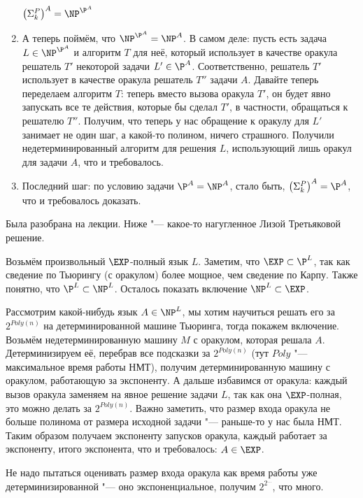\begin{enumerate}
			$\left(\Sigma_k^P\right)^A = \NP^{\P^A}$
		\item
			А теперь поймём, что $\NP^{\P^A}=\NP^A$.
			В самом деле: пусть есть задача $L\in \NP^{\P^A}$ и алгоритм $T$ для неё, который использует в качестве оракула решатель $T'$ некоторой задачи $L'\in \P^A$.
			Соответственно, решатель $T'$ использует в качестве оракула решатель $T''$ задачи $A$.
			Давайте теперь переделаем алгоритм $T$: теперь вместо вызова оракула $T'$, он будет явно запускать все те действия, которые бы сделал $T'$,
			в частности, обращаться к решателю $T''$.
			Получим, что теперь у нас обращение к оракулу для $L'$ занимает не один шаг, а какой-то полином, ничего страшного.
			Получили недетерминированный алгоритм для решения $L$, использующий лишь оракул для задачи $A$, что и требовалось.
		\item
			Последний шаг: по условию задачи $\P^A=\NP^A$, стало быть, $\left(\Sigma_k^P\right)^A = \P^A$, что и требовалось доказать.
	\end{enumerate}

	Была разобрана на лекции.
	Ниже "--- какое-то нагугленное Лизой Третьяковой решение.

	Возьмём произвольный $\EXP$-полный язык $L$.
	Заметим, что $\EXP \subset \P^L$, так как сведение по Тьюрингу (с оракулом) более мощное, чем сведение по Карпу.
	Также понятно, что $\P^L \subset \NP^L$.
	Осталось показать включение $\NP^L \subset \EXP$.

	Рассмотрим какой-нибудь язык $A \in \NP^L$, мы хотим научиться решать его за $2^{Poly(n)}$
	на детерминированной машине Тьюринга, тогда покажем включение.
	Возьмём недетерминированную машину $M$ с оракулом, которая решала $A$.
	Детерминизируем её, перебрав все подсказки за $2^{Poly(n)}$ (тут $Poly$ "--- максимальное время работы НМТ),
	получим детерминированную машину с оракулом, работающую за экспоненту.
	А дальше избавимся от оракула: каждый вызов оракула заменяем на явное решение задачи $L$,
	так как она $\EXP$-полная, это можно делать за $2^{Poly(n)}$.
	Важно заметить, что размер входа оракула не больше полинома от размера исходной задачи "--- раньше-то у нас была НМТ.
	Таким образом получаем экспоненту запусков оракула, каждый работает за экспоненту, итого экспонента,
	что и требовалось: $A \in \EXP$.
	\begin{Rem}
		Не надо пытаться оценивать размер входа оракула как время работы уже детерминизированной "--- оно экспоненциальное, получим
		$2^{2^{\dots}}$, что много.
	\end{Rem}
